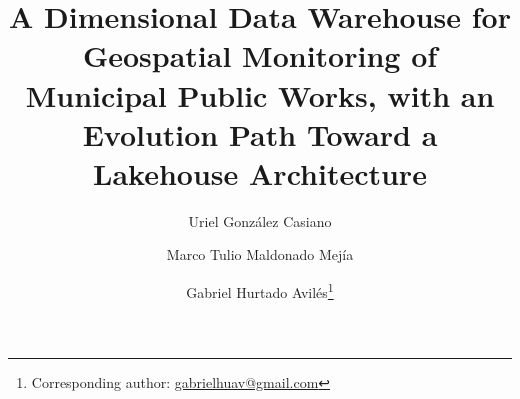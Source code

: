 \documentclass[runningheads]{llncs}
\renewcommand{\_}{\origunderscore\allowbreak}
\begin{document}
\title{A Dimensional Data Warehouse for Geospatial Monitoring of
Municipal Public Works, with an Evolution Path Toward a Lakehouse Architecture}

\author{%
Uriel Gonz\'alez Casiano\href{https://orcid.org/0009-0009-8172-9584}{} \and
Marco Tulio Maldonado Mej\'ia\href{https://orcid.org/0009-0005-4691-9607}{} \and
Gabriel Hurtado Avil\'es\thanks{Corresponding author: \href{mailto:gabrielhuav@gmail.com}{gabrielhuav@gmail.com}}\href{https://orcid.org/0009-0002-5686-1822}{}}



\maketitle
\end{document}
